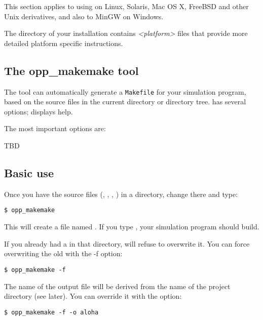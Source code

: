 This section applies to using {\opp} on Linux, Solaris, Mac OS X, FreeBSD and
other Unix derivatives, and also to MinGW on Windows.

\begin{note}
The  directory of your {\opp} installation contains
\textit{<platform>} files that provide more detailed platform specific instructions.
\end{note}


\subsection{The opp\_makemake tool}

The  tool can automatically generate a
\texttt{Makefile} for your simulation program, based on the source files
in the current directory or directory tree.
 has several options; 
displays help.

The most important options are:

TBD

\subsection{Basic use}

Once you have the source files (, , ,
) in a directory, change there and type:

\begin{verbatim}
$ opp_makemake
\end{verbatim}

This will create a file named . If you
type , your simulation program should build.

If you already had a  in that directory, 
will refuse to overwrite it. You can force overwriting the old 
with the -f option:

\begin{verbatim}
$ opp_makemake -f
\end{verbatim}

The name of the output file will be derived from
the name of the project directory (see later). You can override it
with the  option:

\begin{verbatim}
$ opp_makemake -f -o aloha
\end{verbatim}

